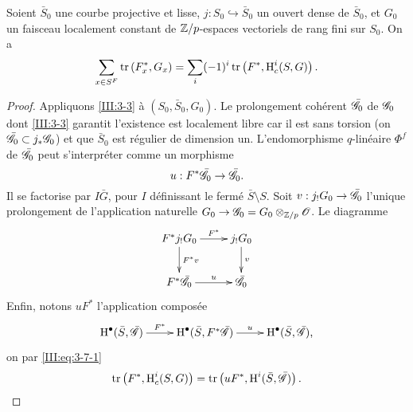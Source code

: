 \begin{theorem_}\label{III:4-1bis}
Soient $\bar S_0$ une courbe projective et lisse, 
$j:S_0\hookrightarrow \bar S_0$ un ouvert dense de $\bar S_0$, et $G_0$ un 
faisceau localement constant de $\mathbb{Z}/p$-espaces vectoriels de rang fini sur 
$S_0$. On a 
\begin{equation}\label{III:eq:4-4-1}
  \sum_{x\in S^F} \operatorname{tr}\left(F_x^*,G_x\right) = \sum_i (-1)^i \operatorname{tr}\left(F^*,\operatorname{H}_c^i(S,G)\right) \text{.}
\end{equation}
\end{theorem_}
\begin{proof}
Appliquons \ref{III:3-3} à $(S_0,\bar S_0,G_0)$. Le prolongement cohérent 
$\bar{\mathscr{G}}_0$ de $\mathscr{G}_0$ dont \ref{III:3-3} garantit l'existence est localement 
libre car il est sans torsion (on  $\bar{\mathscr{G}}_0\subset j_*\mathscr{G}_0$) et que 
$\bar S_0$  est régulier de dimension un. L'endomorphisme $q$-linéaire 
$\Phi^f$ de $\bar{\mathscr{G}}_0$ peut s'interpréter comme un morphisme 
\[
  u : F^*\bar{\mathscr{G}}_0 \to \bar{\mathscr{G}}_0 \text{.}
\]
Il se factorise par $I\bar G$, pour $I$ définissant le fermé 
$\bar S\setminus S$. Soit $v:j_!G_0 \to \bar{\mathscr{G}}_0$ l'unique prolongement de 
l'application naturelle $G_0 \to \mathscr{G}_0 = G_0\otimes_{\mathbb{Z}/p}\mathscr{O}$. Le diagramme 
\begin{equation}\label{III:eq:4-4-2}
\xymatrix{
  F^* j_! G_0 \ar[r]^-{F^*} \ar[d]^-{F^* v} 
    & j_! G_0 \ar[d]^-v \\
  F^*\bar \cG_0 \ar[r]^-u 
    & \bar\cG_0
}
\end{equation}
Enfin, notons $u F^*$ l'application composée 
\[\xymatrix{
  \h^\bullet(\bar S,\bar\cG) \ar[r]^-{F^*} 
    & \h^\bullet(\bar S,F^*\bar\cG) \ar[r]^-u 
    & \h^\bullet(\bar S,\bar\cG) \text{,}
}\]
on par \eqref{III:eq:3-7-1}
\begin{equation}\label{III:eq:4-4-3}
  \operatorname{tr}\left(F^*,\operatorname{H}_c^i(S,G)\right) = \operatorname{tr}\left(u F^*,\operatorname{H}^i(\bar S,\bar{\mathscr{G}})\right) \text{.}
\end{equation}


\end{proof}
